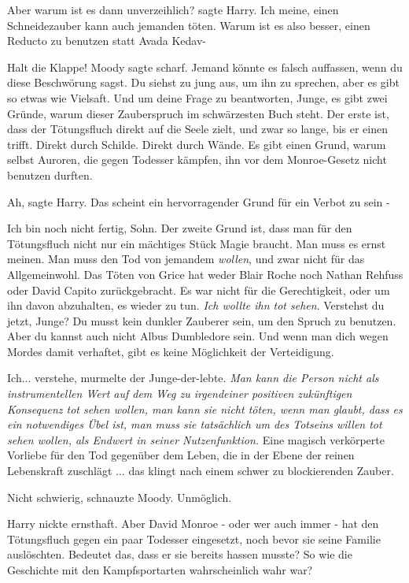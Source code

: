 \glqq{}Aber warum ist es dann unverzeihlich?\grqq{} sagte Harry. \glqq{}Ich meine,
einen Schneidezauber kann auch jemanden töten. Warum ist es also besser, einen
Reducto zu benutzen statt Avada Kedav-\grqq{}

\glqq{}Halt die Klappe!\grqq{} Moody sagte scharf. \glqq{}Jemand könnte es falsch
auffassen, wenn du diese Beschwörung sagst. Du siehst zu jung aus, um ihn zu
sprechen, aber es gibt so etwas wie Vielsaft. Und um deine Frage zu beantworten,
Junge, es gibt zwei Gründe, warum dieser Zauberspruch im schwärzesten Buch
steht. Der erste ist, dass der Tötungsfluch direkt auf die Seele zielt, und zwar
so lange, bis er einen trifft. Direkt durch Schilde. Direkt durch Wände. Es gibt
einen Grund, warum selbst Auroren, die gegen Todesser kämpfen, ihn vor dem
Monroe-Gesetz nicht benutzen durften.\grqq{}

\glqq{}Ah\grqq{}, sagte Harry. \glqq{}Das scheint ein hervorragender Grund für ein
Verbot zu sein -\grqq{}

\glqq{}Ich bin noch nicht fertig, Sohn. Der zweite Grund ist, dass man für den
Tötungsfluch nicht nur ein mächtiges Stück Magie braucht. Man muss es ernst
meinen. Man muss den Tod von jemandem \emph{wollen}, und zwar nicht für das
Allgemeinwohl. Das Töten von Grice hat weder Blair Roche noch Nathan Rehfuss
oder David Capito zurückgebracht. Es war nicht für die Gerechtigkeit, oder um
ihn davon abzuhalten, es wieder zu tun. \emph{Ich wollte ihn tot sehen}.
Verstehst du jetzt, Junge? Du musst kein dunkler Zauberer sein, um den Spruch zu
benutzen. Aber du kannst auch nicht Albus Dumbledore sein. Und wenn man dich
wegen Mordes damit verhaftet, gibt es keine Möglichkeit der Verteidigung.\grqq{}

\glqq{}Ich... verstehe\grqq{}, murmelte der Junge-der-lebte. \emph{Man kann die
Person nicht als instrumentellen Wert auf dem Weg zu irgendeiner positiven
zukünftigen Konsequenz tot sehen wollen, man kann sie nicht töten, wenn man
glaubt, dass es ein notwendiges Übel ist, man muss sie tatsächlich um des
Totseins willen tot sehen wollen, als Endwert in seiner Nutzenfunktion.} \glqq{}
Eine magisch verkörperte Vorliebe für den Tod gegenüber dem Leben, die in der
Ebene der reinen Lebenskraft zuschlägt ... das klingt nach einem schwer zu
blockierenden Zauber.\grqq{}

\glqq{}Nicht schwierig\grqq{}, schnauzte Moody. \glqq{}Unmöglich.\grqq{}

Harry nickte ernsthaft. \glqq{}Aber David Monroe - oder wer auch immer - hat den
Tötungsfluch gegen ein paar Todesser eingesetzt, noch bevor sie seine Familie
auslöschten. Bedeutet das, dass er sie bereits hassen musste? So wie die
Geschichte mit den Kampfsportarten wahrscheinlich wahr war?\grqq{}

